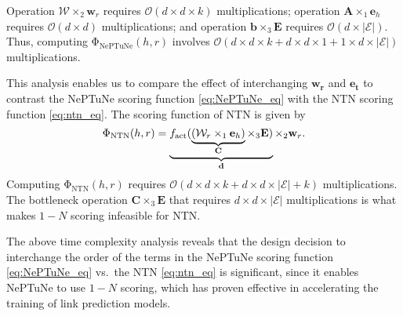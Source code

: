 \documentclass[11pt]{article}
\begin{document}
Operation $\mathrm{\mathcal{W}} \times_2 \mathbf{w}_r$ requires $\mathcal{O}(d \times d \times k)$ multiplications; operation $\mathbf{A} \times_1 \mathbf{e}_h$ requires $\mathcal{O}(d \times d)$ multiplications; and operation $\mathbf{b} \times_3 \mathbf{E}$ requires $\mathcal{O}(d \times \mathcal{|E|})$. 
Thus, computing $\mathbf{\mathrm{\Phi}}_{\text{NePTuNe}}(h, r)$ involves $\mathcal{O}(d \times d \times k + d \times d \times 1 + 1 \times d \times \mathcal{|E|})$ multiplications.

This analysis enables us to compare the effect of interchanging $\mathbf{w_r}$ and $\mathbf{e_t}$ to contrast the NePTuNe scoring function \eqref{eq:NePTuNe_eq} with the NTN scoring function \eqref{eq:ntn_eq}. 
The scoring function of NTN is given by
\begin{equation}
    \mathbf{\mathrm{\Phi}}_{\text{NTN}}(h, r) = \underbrace{f_{\rm act}(\underbrace{(\mathrm{\mathcal{W}}_r \times_1 \mathbf{e}_h)}_{\mathbf{C}} \times_3 \mathbf{E} )}_{\mathbf{d}} \times_2 \mathbf{w}_r.
\end{equation}
Computing $\mathbf{\mathrm{\Phi}}_{\text{NTN}}(h, r)$ requires $\mathcal{O}(d \times d \times k + d \times d \times \mathcal{|E|} + k)$ multiplications. 
The bottleneck operation $\mathbf{C} \times_3 \mathbf{E}$ that requires $d \times d \times \mathcal{|E|}$ multiplications is what makes $1-N$ scoring infeasible for NTN.

The above time complexity analysis reveals that the design decision to interchange the order of the terms in the NePTuNe scoring function \eqref{eq:NePTuNe_eq} vs.\ the NTN \eqref{eq:ntn_eq} is significant, since it enables NePTuNe to use $1-N$ scoring, which has proven effective in accelerating the training of link prediction models.
\end{document}
